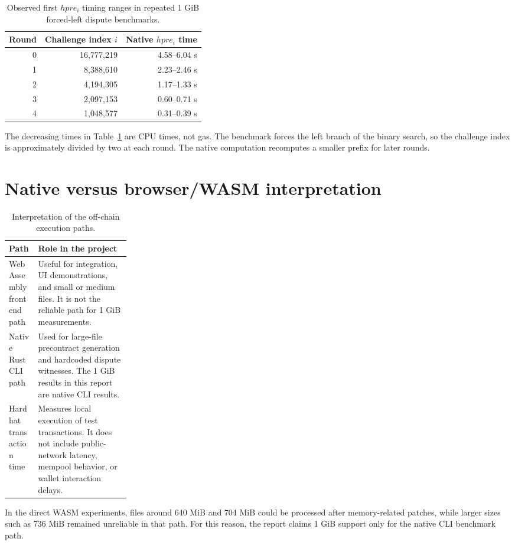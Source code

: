\begin{table}[H]
  \centering
  \begin{tabular}{rrr}
    \toprule
    Round & Challenge index \(i\) & Native \(hpre_i\) time \\
    \midrule
    0 & 16,777,219 & 4.58--6.04 s \\
    1 & 8,388,610 & 2.23--2.46 s \\
    2 & 4,194,305 & 1.17--1.33 s \\
    3 & 2,097,153 & 0.60--0.71 s \\
    4 & 1,048,577 & 0.31--0.39 s \\
    \bottomrule
  \end{tabular}
  \caption{Observed first \(hpre_i\) timing ranges in repeated 1 GiB forced-left dispute benchmarks.}
  \label{tab:app-hpre-rounds}
\end{table}

The decreasing times in Table~\ref{tab:app-hpre-rounds} are CPU times, not gas. The
benchmark forces the left branch of the binary search, so the challenge index is
approximately divided by two at each round. The native computation recomputes a smaller
prefix for later rounds.

\section{Native versus browser/WASM interpretation}

\begin{table}[H]
  \centering
  \begin{tabularx}{\linewidth}{>{\raggedright\arraybackslash}p{0.24\linewidth}>{\raggedright\arraybackslash}X}
    \toprule
    Path & Role in the project \\
    \midrule
    WebAssembly frontend path & Useful for integration, UI demonstrations, and small or
    medium files. It is not the reliable path for 1 GiB measurements. \\
    Native Rust CLI path & Used for large-file precontract generation and hardcoded
    dispute witnesses. The 1 GiB results in this report are native CLI results. \\
    Hardhat transaction time & Measures local execution of test transactions. It does not
    include public-network latency, mempool behavior, or wallet interaction delays. \\
    \bottomrule
  \end{tabularx}
  \caption{Interpretation of the off-chain execution paths.}
  \label{tab:app-native-vs-wasm}
\end{table}

In the direct WASM experiments, files around 640 MiB and 704 MiB could be processed after
memory-related patches, while larger sizes such as 736 MiB remained unreliable in that path.
For this reason, the report claims 1 GiB support only for the native CLI benchmark path.
